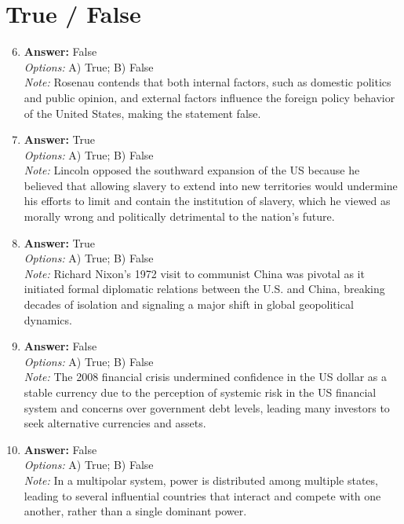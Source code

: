 \documentclass[12pt]{article}
\begin{document}
\section*{True / False}
\begin{enumerate}[label=\arabic*.]
\setcounter{enumi}{5}
\item \textbf{Answer:} False
\\ \textit{Options:} A) True; B) False
\\ \textit{Note:} Rosenau contends that both internal factors, such as domestic politics and public opinion, and external factors influence the foreign policy behavior of the United States, making the statement false.
\item \textbf{Answer:} True
\\ \textit{Options:} A) True; B) False
\\ \textit{Note:} Lincoln opposed the southward expansion of the US because he believed that allowing slavery to extend into new territories would undermine his efforts to limit and contain the institution of slavery, which he viewed as morally wrong and politically detrimental to the nation's future.
\item \textbf{Answer:} True
\\ \textit{Options:} A) True; B) False
\\ \textit{Note:} Richard Nixon's 1972 visit to communist China was pivotal as it initiated formal diplomatic relations between the U.S. and China, breaking decades of isolation and signaling a major shift in global geopolitical dynamics.
\item \textbf{Answer:} False
\\ \textit{Options:} A) True; B) False
\\ \textit{Note:} The 2008 financial crisis undermined confidence in the US dollar as a stable currency due to the perception of systemic risk in the US financial system and concerns over government debt levels, leading many investors to seek alternative currencies and assets.
\item \textbf{Answer:} False
\\ \textit{Options:} A) True; B) False
\\ \textit{Note:} In a multipolar system, power is distributed among multiple states, leading to several influential countries that interact and compete with one another, rather than a single dominant power.
\end{enumerate}
\end{document}
